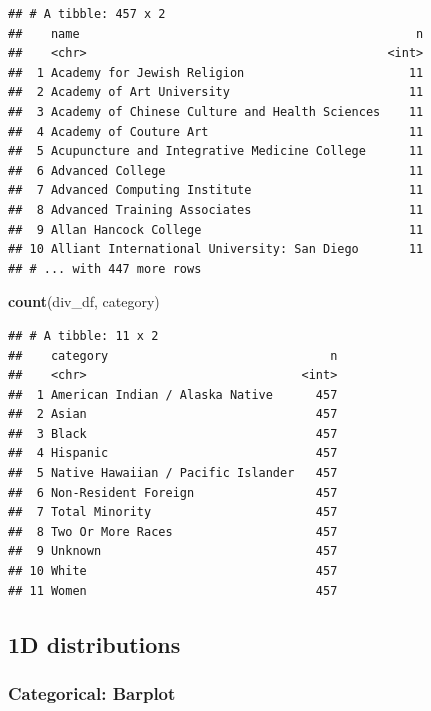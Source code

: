\documentclass[
]{article}
\newenvironment{Shaded}{\begin{snugshade}}{\end{snugshade}}
\newcommand{\KeywordTok}[1]{\textcolor[rgb]{0.13,0.29,0.53}{\textbf{#1}}}
\newcommand{\NormalTok}[1]{#1}
\begin{document}
\begin{verbatim}
## # A tibble: 457 x 2
##    name                                               n
##    <chr>                                          <int>
##  1 Academy for Jewish Religion                       11
##  2 Academy of Art University                         11
##  3 Academy of Chinese Culture and Health Sciences    11
##  4 Academy of Couture Art                            11
##  5 Acupuncture and Integrative Medicine College      11
##  6 Advanced College                                  11
##  7 Advanced Computing Institute                      11
##  8 Advanced Training Associates                      11
##  9 Allan Hancock College                             11
## 10 Alliant International University: San Diego       11
## # ... with 447 more rows
\end{verbatim}

\begin{Shaded}
\begin{Highlighting}[]
\KeywordTok{count}\NormalTok{(div\_df, category)}
\end{Highlighting}
\end{Shaded}

\begin{verbatim}
## # A tibble: 11 x 2
##    category                               n
##    <chr>                              <int>
##  1 American Indian / Alaska Native      457
##  2 Asian                                457
##  3 Black                                457
##  4 Hispanic                             457
##  5 Native Hawaiian / Pacific Islander   457
##  6 Non-Resident Foreign                 457
##  7 Total Minority                       457
##  8 Two Or More Races                    457
##  9 Unknown                              457
## 10 White                                457
## 11 Women                                457
\end{verbatim}

\hypertarget{d-distributions}{%
\subsection{1D distributions}\label{d-distributions}}

\hypertarget{categorical-barplot}{%
\subsubsection{Categorical: Barplot}\label{categorical-barplot}}
\end{document}
